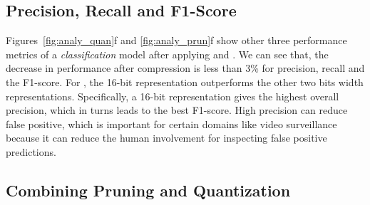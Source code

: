 \subsection{Precision, Recall and F1-Score}

Figures~\ref{fig:analy_quan}f and \ref{fig:analy_prun}f show other three performance metrics of a \emph{classification} model after
applying \quantization and \pruning. We can see that, the decrease in performance after compression is  less than 3\% for precision, recall
and the F1-score. For \quantization, the 16-bit representation outperforms the other two bits width representations. Specifically,  a
16-bit representation gives the highest overall precision, which in turns leads to the best F1-score. High precision can reduce false
positive, which is important for certain domains like video surveillance because it can reduce the human involvement for inspecting false
positive predictions.







\subsection{Combining Pruning and Quantization\label{sec:combin}}

